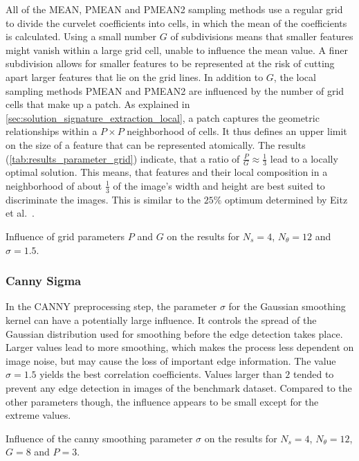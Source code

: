 All of the MEAN, PMEAN and PMEAN2 sampling methods use a regular grid to divide
the curvelet coefficients into cells, in which the mean of the coefficients is
calculated. Using a small number $G$ of subdivisions means that smaller
features might vanish within a large grid cell, unable to influence the mean
value. A finer subdivision allows for smaller features to be represented at the
risk of cutting apart larger features that lie on the grid lines. In addition
to $G$, the local sampling methods PMEAN and PMEAN2 are influenced by the
number of grid cells that make up a patch. As explained in
\autoref{sec:solution_signature_extraction_local}, a patch captures the
geometric relationships within a $P \times P$ neighborhood of cells. It thus
defines an upper limit on the size of a feature that can be represented
atomically. The results (\autoref{tab:results_parameter_grid}) indicate, that a
ratio of $\frac{P}{G} \approx \frac{1}{3}$ lead to a locally optimal solution.
This means, that features and their local composition in a neighborhood of
about $\frac{1}{3}$ of the image's width and height are best suited to
discriminate the images. This is similar to the $25\%$ optimum determined by
Eitz et al.\ \autocite{eitz_sketch-based_2011}.

\begin{table}[h]
    \centering
    \resultsparametergrid
    \caption[Grid Size Parameter Results]{
        Influence of grid parameters $P$ and $G$ on the results for $N_s=4$,
        $N_{\theta}=12$ and $\sigma=1.5$.
    }
    \label{tab:results_parameter_grid}
\end{table}

\FloatBarrier
\subsubsection{Canny Sigma}

In the CANNY preprocessing step, the parameter $\sigma$ for the Gaussian
smoothing kernel can have a potentially large influence. It controls the spread
of the Gaussian distribution used for smoothing before the edge detection takes
place. Larger values lead to more smoothing, which makes the process less
dependent on image noise, but may cause the loss of important edge information.
The value $\sigma = 1.5$ yields the best correlation coefficients. Values
larger than $2$ tended to prevent any edge detection in images of the benchmark
dataset. Compared to the other parameters though, the influence appears to be
small except for the extreme values.

\begin{table}[h]
    \centering
    \resultsparametercanny
    \caption[Canny Parameter Results]{
        Influence of the canny smoothing parameter $\sigma$ on the results for
        $N_s=4$, $N_{\theta}=12$, $G=8$ and $P=3$.
    }
    \label{tab:results_parameter_canny}
\end{table}

\FloatBarrier

